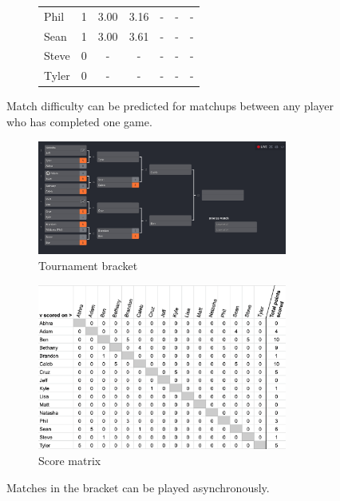 \documentclass[letterpaper, 10 pt, conference]{ieeeconf}  %
\begin{document}
\begin{figure}[hb]
\begin{subfigure}[h]{0.4\textwidth}
\begin{tabular}{lccc|ccc}
                        Phil	& 1	& 3.00	& 3.16 & - & - & - \\
                        Sean	& 1	& 3.00	& 3.61 & - & - & - \\
                        Steve	& 0	& -  	& -    & - & - & - \\
                        Tyler	& 0	& -  	& -    & - & - & - \\
                        \bottomrule
                \end{tabular}
        \end{subfigure}
        \caption{Match difficulty can be predicted for matchups between 
                 any player who has completed one game.}
\end{figure}

\begin{figure}[hb]
        \centering
        \begin{subfigure}[h]{0.4\textwidth}
                \centering
                \includegraphics[width=0.9\textwidth]{fig/singles-bracket_3.png}
                \caption{Tournament bracket}
        \end{subfigure}
        \begin{subfigure}[h]{0.4\textwidth}
                \centering
                \includegraphics[width=0.9\textwidth]{fig/score-matrix_3.png}
                \caption{Score matrix}
        \end{subfigure}
        \caption{Matches in the bracket can be played asynchronously.}
\end{figure}
\end{document}
